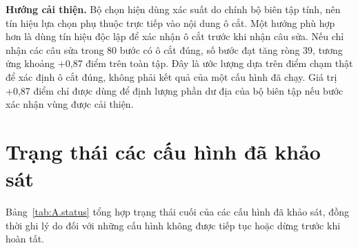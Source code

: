 \textbf{Hướng cải thiện.} Bộ chọn hiện dùng xác suất do chính bộ biên tập tính, nên tín hiệu lựa chọn phụ thuộc trực tiếp vào nội dung ô cắt. Một hướng phù hợp hơn là dùng tín hiệu độc lập để xác nhận ô cắt trước khi nhận câu sửa. Nếu chỉ nhận các câu sửa trong 80 bước có ô cắt đúng, số bước đạt tăng ròng 39, tương ứng khoảng +0,87 điểm trên toàn tập. Đây là ước lượng dựa trên điểm chạm thật để xác định ô cắt đúng, không phải kết quả của một cấu hình đã chạy. Giá trị +0,87 điểm chỉ được dùng để định lượng phần dư địa của bộ biên tập nếu bước xác nhận vùng được cải thiện.


\section{Trạng thái các cấu hình đã khảo sát}\label{sec:A.status}

Bảng~\ref{tab:A.status} tổng hợp trạng thái cuối của các cấu hình đã khảo sát, đồng thời ghi lý do đối với những cấu hình không được tiếp tục hoặc dừng trước khi hoàn tất.

